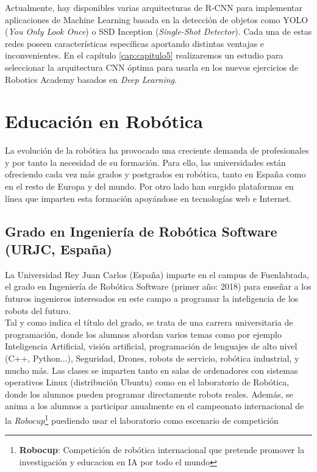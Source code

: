 Actualmente, hay disponibles varias arquitecturas de R-CNN para implementar aplicaciones de Machine Learning basada en la detección de objetos como YOLO (\textit{You Only Look Once}) o SSD Inception (\textit{Single-Shot Detector}). Cada una de estas redes poseen características específicas aportando distintas ventajas e inconvenientes. En el capítulo \ref{cap:capitulo5} realizaremos un estudio para seleccionar la arquitectura CNN óptima para usarla en los nuevos ejercicios de Robotics Academy basados en \textit{Deep Learning}.


\section{Educación en Robótica}
\label{sec:educacion_robotica}

La evolución de la robótica ha provocado una creciente demanda de profesionales y por tanto la necesidad de su formación. Para ello, las universidades están ofreciendo cada vez más grados y postgrados en robótica, tanto en España como en el resto de Europa y del mundo. Por otro lado han surgido plataformas en línea que imparten esta formación apoyándose en tecnologías web e Internet.

\subsection{Grado en Ingeniería de Robótica Software (URJC, España)}
\label{subsec:grado_robotica_software}
La Universidad Rey Juan Carlos (España) imparte en el campus de Fuenlabrada, el grado en Ingeniería de Robótica Software (primer año: 2018) para enseñar a los futuros ingenieros interesados en este campo a programar la inteligencia de los robots del futuro.\\

Tal y como indica el título del grado, se trata de una carrera universitaria de programación, donde los alumnos abordan varios temas como por ejemplo Inteligencia Artificial, visión artificial, programación de lenguajes de alto nivel (C++, Python...), Seguridad, Drones, robots de servicio, robótica industrial, y mucho más. Las clases se imparten tanto en salas de ordenadores con sistemas operativos Linux (distribución Ubuntu) como en el laboratorio de Robótica, donde los alumnos pueden programar directamente robots reales. Además, se anima a los alumnos a participar anualmente en el campeonato internacional de la \textit{Robocup}\footnote{\textbf{Robocup}: Competición de robótica internacional que pretende promover la investigación y educacion en IA por todo el mundo} puediendo usar el laboratorio como escenario de competición\\

